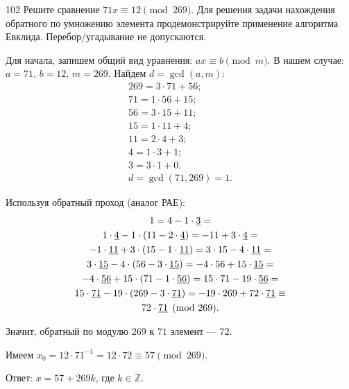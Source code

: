\begin{task}{102}
Решите сравнение $71x\equiv 12\pmod{269}$. Для решения задачи нахождения обратного по умножению элемента продемонстрируйте применение алгоритма Евклида. Перебор/угадывание не допускаются.
\end{task}

\begin{solution}
Для начала, запишем общий вид уравнения: $ax\equiv b\pmod{m}$. В нашем случае: $a = 71 ,\, b = 12 ,\, m = 269$. Найдем $d = \operatorname{gcd}(a, m)$:
\begin{align*}
    269 = 3\cdot71 + 56;\\
    71 = 1\cdot56 + 15;\\
    56 = 3\cdot15 + 11;\\
    15 = 1\cdot11 + 4;\\
    11 = 2\cdot4 + 3;\\
    4 = 1\cdot3 + 1;\\
    3 = 3\cdot1 + 0.\\
    d = \operatorname{gcd}(71, 269) = 1.
\end{align*}
\par
Используя обратный проход (аналог РАЕ):
\begin{gather*}
1 = 4 - 1\cdot\uline{3} = \\
1\cdot\uline{4} - 1\cdot(11 - 2\cdot\uline{4}) = -11 + 3\cdot\uline{4} = \\
-1\cdot\uline{11} + 3\cdot(15 - 1\cdot\uline{11}) = 3\cdot15 - 4\cdot\uline{11} = \\
3\cdot\uline{15} - 4\cdot(56 - 3\cdot\uline{15}) = -4\cdot56 + 15\cdot\uline{15} = \\
-4\cdot\uline{56} + 15\cdot(71 - 1\cdot\uline{56}) = 15\cdot71 - 19\cdot\uline{56} = \\
15\cdot\uline{71} - 19\cdot(269 - 3\cdot\uline{71}) = -19\cdot269 + 72\cdot\uline{71} \equiv \\
72\cdot\uline{71} \pmod{269}.
\end{gather*}\par
Значит, обратный по модулю $269$ к $71$ элемент --- $72$.\par
Имеем $x_0 = 12\cdot71^{-1}=12\cdot72\equiv 57 \pmod{269}$.\par
Ответ: $x = 57 + 269k$, где $k \in \mathbb{Z}$.
\end{solution}